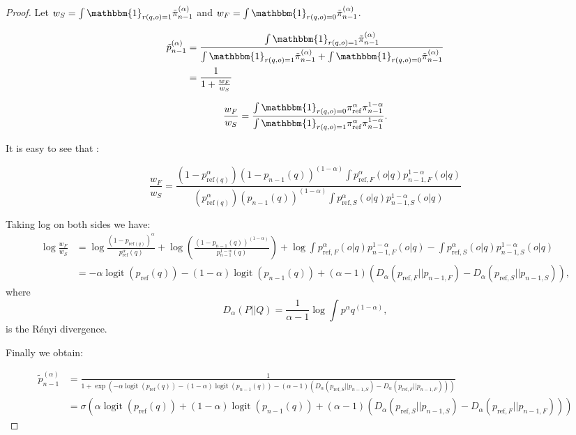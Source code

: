 \documentclass[11pt,reqno]{amsart}
\DeclareMathOperator{\logit}{logit}
\begin{document}
\begin{proof}
Let $w_{S}= \int \mathbbm{1}_{r(q,o)=1} \tilde{\pi}^{(\alpha)}_{n-1}$ and $w_{F}= \int \mathbbm{1}_{r(q,o)=0} \tilde{\pi}^{(\alpha)}_{n-1}$. 


\begin{align}
 \tilde{p}^{(\alpha)}_{n-1} & = \frac{\int \mathbbm{1}_{r(q,o)=1} \tilde{\pi}^{(\alpha)}_{n-1}}{ \int \mathbbm{1}_{r(q,o)=1} \tilde{\pi}^{(\alpha)}_{n-1} +  \int \mathbbm{1}_{r(q,o)=0} \tilde{\pi}^{(\alpha)}_{n-1} }\\
 & = \frac{1}{1+ \frac{w_{F}}{w_{S}}}
 \end{align}
 
 \begin{equation}
 \frac{w_{F}}{w_{S}}= \frac{\int \mathbbm{1}_{r(q,o)=0} \pi^{\alpha}_{\mathrm{ref}}\pi_{n-1}^{1-\alpha} }{\int \mathbbm{1}_{r(q,o)=1} \pi^{\alpha}_{\mathrm{ref}}\pi_{n-1}^{1-\alpha} } . 
 \end{equation}


It is easy to see that : 

\begin{equation}
 \frac{w_{F}}{w_{S}} = \frac{(1-p_{\mathrm{ref}(q)}^{\alpha}) (1-p_{n-1}(q))^{(1-\alpha)}\int p^{\alpha}_{\mathrm{ref}, F} (o|q)p_{n-1,F}^{1-\alpha}(o|q)}{(p_{\mathrm{ref}(q)}^{\alpha}) (p_{n-1}(q))^{(1-\alpha)}\int p^{\alpha}_{\mathrm{ref},S} (o|q)p_{n-1,S}^{1-\alpha}(o|q)}
\end{equation}

Taking log on both sides we have: 
\begin{align*}
\log \frac{w_{F}}{w_{S}} &= \log  \frac{(1-p_{\mathrm{ref}(q)})^{\alpha}}{p_{\mathrm{ref}}^{\alpha}(q)} + \log \left( \frac{(1-p_{n-1}(q))^{(1-\alpha)}}{p_{n-1}^{1-\alpha}(q)}\right) + \log  \int p^{\alpha}_{\mathrm{ref},F} (o|q)p_{n-1,F}^{1-\alpha}(o|q) - \int p^{\alpha}_{\mathrm{ref},S} (o|q)p_{n-1,S}^{1-\alpha}(o|q)\\
&=- \alpha \logit(p_{\mathrm{ref}}(q)) -(1-\alpha) \logit (p_{n-1}(q)) + (\alpha-1) \left( D_{\alpha}( p_{\mathrm{ref},F}|| p_{n-1,F}  ) - D_{\alpha}( p_{\mathrm{ref},S}|| p_{n-1,S}  )  \right),
\end{align*}
where 
\[D_{\alpha} (P || Q) = \frac{1}{\alpha-1} \log \int p^\alpha q^{(1-\alpha)},\]
is the Rényi divergence.

Finally we obtain:

\begin{align*}
 \tilde{p}^{(\alpha)}_{n-1} &= \frac{1}{1+ \exp(- \alpha \logit(p_{\mathrm{ref}}(q)) -(1-\alpha) \logit (p_{n-1}(q)) - ( \alpha-1 ) \left(  D_{\alpha}( p_{\mathrm{ref},S}|| p_{n-1,S})  - D_{\alpha}( p_{\mathrm{ref},F}|| p_{n-1,F}  )    \right))}\\
 &= \sigma( \alpha \logit(p_{\mathrm{ref}}(q)) +(1-\alpha) \logit (p_{n-1}(q)) + ( \alpha-1 ) \left(  D_{\alpha}( p_{\mathrm{ref},S}|| p_{n-1,S})  - D_{\alpha}( p_{\mathrm{ref},F}|| p_{n-1,F}  )    \right))
\end{align*}


\end{proof}
\end{document}
